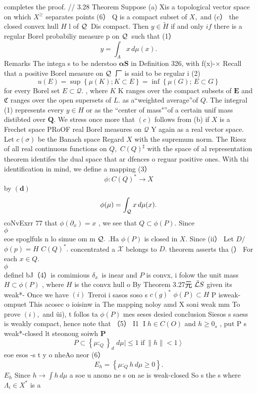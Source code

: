 completes the proof. // 3.28 Theorem Suppose (a) Xis a topological vector space on which $X^{\geq}$ separates points (6） Q is a compact subset of $X,$ and (c） the closed convex hull $H$ l of ${\cal Q}\,$ Dis compact. Then $y\in{\tilde{H}}$ if and only $i f$ there is a regular Borel probabiliy measure p on ${\cal Q}\,$ such that (1） $$ y=\int_{A}x\,d\mu(x). $$ Remarks The intega s to be nderstoo ${\boldsymbol{\alpha}}\mathbf{S}$ in Definition 326, with f(x)-× Recall that a positive Borel measure on ${\cal Q}\,$ 厂 is said to be regular i (2) $$ u(E)=\operatorname*{sup}\left\{\mu(K);K\subset E\right\}=\operatorname*{inf}\left\{\mu(G);\,E\subset G\right\} $$ for every Borel set $E\subset{\mathcal{Q}}.$ , where $\textstyle K$ K ranges over the compact subsets of ${\boldsymbol{E}}$ and ${\mathfrak{C}}$ ranges over the open supersets of $L.$ as a“weighted average”of $Q.$ The integral (1) represents every $y\in H$ or as the “center of mass"”of a certain unif mass distibted over ${\boldsymbol{Q}}.$ We stress once more that $\left(c\right)$ follows from (b) if $\textstyle X$ is a Frechet space PRoOF real Borel measures on ${\mathcal{Q}}$ Y again as a real vector space. Let $c(\sigma)$ be the Banach space Regard $X$ with the supremum norm. The Riesz of all real continuous functions on ${\underline{{Q}}},$ $C(Q)^{\sharp}$ with the space of al representation theorem identifes the dual space that ar dfences o reguar positive ones. With thi identification in mind, we define a mapping (3） $$ \phi\colon C(Q)^{*}\to X $$ by $(\mathbf{d})$ $$ \phi(\mu)=\int_{\cal Q}x\,d\mu(x). $$coNvExrr $77$ that $\phi(\partial_{x})=x$ , we see that $Q\subset\phi(P).$ Since $\phi~~~~~~~~~~~~~~~~~~~~~~~~~~~~~~~~~~~~~~~~~~~~~~~~~~~~~~~~~~~~~~~~~~~~~~~~~~~~~~~~~~~~~~~~~~~~~~~~~~~~~~~~~~~~~~~~~~~~~~~~~~~~~~~~~~~~~~~~~~~~~~~~~~~~~~~~~~~~~~~~~~~~~~~~~~~~~~~~~~~~~~~~~~~~~~~~~~~~~~~~~~~~~~~~~~~~~~$ eoe spoglfuls n lo simue om m ${\cal Q}.$ .Ha $\phi(P)$ is closed in $X.$ Since (ii） Let $D\!\!\!\!/$ $\phi(p)=H$ $C(Q)^{*}.$ concentrated a $\textstyle{\mathcal{X}}$ belongs to $D.$ theorem asserts tha (） For each $x\in Q.$ $\phi~~~~~~~~~~~~~~~~~~~~~~~~~~~~~~~~~~~~~~~~~~~~~~~~~~~~~~~~~~~~~~~~~~~~~~~~~~~~~~~~~~~~~~~~~~~~~~~~~~~~~~~~~~~~~~~~~~~~~~~~~~~~~~~~~~~~~~~~~~~~~~~~~~~~~~~~~~~~~~~~~~~~~~~~~~~~~~~~~~~~~~~~~~~~~~~~~~~~~~~~~~~~~~~~$ definel bJ（4）is comimious $\delta_{x}\,$ is inear and $\boldsymbol{\mathit{P}}$ is convx, i folow the unit mass $H\subset\phi(P)$ , where ${\mathbf{}}H$ is the convx hull o By Theorem 3.27元 $\bar{\cal L}S$ given its weak*- Once we have $\left(i\right)$ Treroi i sasos soso s $c(g)^{*}$ $\phi(P)\subset H$ P isweak-ompuet This acosec o ioisinw ia The mapping noloy amd X soni weak mm To prove $(i),$ and üi), t follos ta $\phi(P)$ mes seses desied conclusion Siesos s saess is weakly compact, hence note that （5） I1 $\operatorname{I}h\in C(O)$ and $h\geq0_{s}$ , put P s weak*-closed lt steonoug soiwh $\boldsymbol{P}$ $$ P\subset\left\{\mu\colon_{Q}\right\}_{d}\;d\mu\left|\leq1\;{\mathrm{if~}}\|h\|<1\right> $$ eoe esos -s t y o nheAo neor (6） $$ E_{h}=\left\{\mu\colon_{Q}h\,d\mu\geq0\right\}. $$ $E_{h}$ Since $h\to\textstyle\int h\,d\mu$ a soe u anono ne s on ae is weak-closed So s the s where $\Lambda_{i}\in X^{*}$ is a 